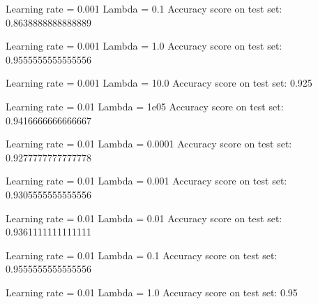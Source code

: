 \documentclass[letterpaper,10pt,english]{sphinxmanual}
\begin{document}
\begin{sphinxVerbatim}[commandchars=\\\{\}]
Learning rate  =  0.001
Lambda =  0.1
Accuracy score on test set:  0.8638888888888889
\end{sphinxVerbatim}

\begin{sphinxVerbatim}[commandchars=\\\{\}]
Learning rate  =  0.001
Lambda =  1.0
Accuracy score on test set:  0.9555555555555556
\end{sphinxVerbatim}

\begin{sphinxVerbatim}[commandchars=\\\{\}]
Learning rate  =  0.001
Lambda =  10.0
Accuracy score on test set:  0.925
\end{sphinxVerbatim}

\begin{sphinxVerbatim}[commandchars=\\\{\}]
Learning rate  =  0.01
Lambda =  1e\PYGZhy{}05
Accuracy score on test set:  0.9416666666666667
\end{sphinxVerbatim}

\begin{sphinxVerbatim}[commandchars=\\\{\}]
Learning rate  =  0.01
Lambda =  0.0001
Accuracy score on test set:  0.9277777777777778
\end{sphinxVerbatim}

\begin{sphinxVerbatim}[commandchars=\\\{\}]
Learning rate  =  0.01
Lambda =  0.001
Accuracy score on test set:  0.9305555555555556
\end{sphinxVerbatim}

\begin{sphinxVerbatim}[commandchars=\\\{\}]
Learning rate  =  0.01
Lambda =  0.01
Accuracy score on test set:  0.9361111111111111
\end{sphinxVerbatim}

\begin{sphinxVerbatim}[commandchars=\\\{\}]
Learning rate  =  0.01
Lambda =  0.1
Accuracy score on test set:  0.9555555555555556
\end{sphinxVerbatim}

\begin{sphinxVerbatim}[commandchars=\\\{\}]
Learning rate  =  0.01
Lambda =  1.0
Accuracy score on test set:  0.95
\end{sphinxVerbatim}
\end{document}
